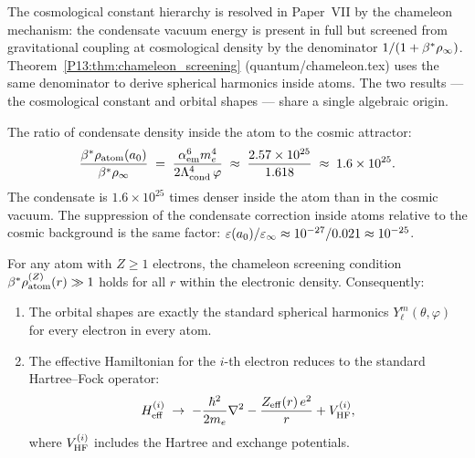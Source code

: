\begin{remark}
\label{P13:rem:same_mechanism}
The cosmological constant hierarchy is resolved in Paper~VII
by the chameleon mechanism: the condensate vacuum energy is present in full
but screened from gravitational coupling at cosmological density by
the denominator $1/(1+\beta^{*}\rho_\infty)$.
Theorem~\ref{P13:thm:chameleon_screening} (quantum/chameleon.tex) uses the same
denominator to derive spherical harmonics inside atoms.
The two results --- the cosmological constant and orbital shapes ---
share a single algebraic origin.
\end{remark}

\begin{remark}
\label{P13:rem:screening_ratio}
The ratio of condensate density inside the atom to the cosmic attractor:
\[
  \frac{\beta^{*}\rho_{\mathrm{atom}}(a_0)}{\beta^{*}\rho_{\infty}}
  \;=\; \frac{\alpha_{\mathrm{em}}^6 m_e^4}{2\Lambda_{\mathrm{cond}}^4\,\varphi}
  \;\approx\; \frac{2.57\times10^{25}}{1.618}
  \;\approx\; 1.6\times10^{25}.
\]
The condensate is $1.6\times10^{25}$ times denser inside the atom
than in the cosmic vacuum.
The suppression of the condensate correction inside atoms relative
to the cosmic background is the same factor:
$\varepsilon(a_0)/\varepsilon_\infty \approx 10^{-27}/0.021 \approx 10^{-25}$.
\end{remark}

\begin{proposition}
\label{P13:prop:multi_electron_screening}
For any atom with $Z\ge1$ electrons, the chameleon screening condition
$\beta^{*}\rho_{\rm atom}^{(Z)}(r)\gg1$ holds for all $r$ within the
electronic density.
Consequently:
\begin{enumerate}[noitemsep,label=(\roman*)]
\item The orbital shapes are exactly the standard spherical harmonics
  $Y_\ell^m(\theta,\varphi)$ for every electron in every atom.
\item The effective Hamiltonian for the $i$-th electron reduces to
  the standard Hartree--Fock operator:
  \begin{equation}
    H_{\mathrm{eff}}^{(i)} \;\to\; -\frac{\hbar^2}{2m_e}\nabla^2
    - \frac{Z_{\rm eff}(r)\,e^2}{r}
    + V_{\rm HF}^{(i)},
    \label{P13:eq:H_HF_limit}
  \end{equation}
  where $V_{\rm HF}^{(i)}$ includes the Hartree and exchange potentials.
\end{enumerate}
\end{proposition}

